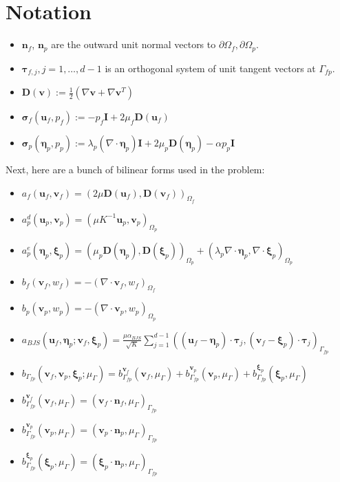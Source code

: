 \documentclass{article}
\newcommand{\mathspace}[1]{\ensuremath{#1}\xspace} %
\newcommand{\D}{\mathspace{\mathbf{D}}}
\newcommand{\sigmabf}{\mathspace{\boldsymbol{\sigma}}}
\newcommand{\grad}{\mathspace{\nabla}}
\renewcommand{\div}{\mathspace{\nabla \cdot}}
\newcommand{\inner}[2]{\mathspace{\left (#1, #2 \right)}}
\newcommand{\defeq}{\mathspace{:=}}
\newcommand{\taubf}{\mathspace{\boldsymbol{\tau}}}
\newcommand{\stokes}{\mathspace{\Omega_{f}}}
\newcommand{\darcy}{\mathspace{\Omega_{p}}}
\newcommand{\interface}{\mathspace{\Gamma_{fp}}}
\newcommand{\nf}{\mathspace{\mathbf{n}_f}}
\newcommand{\np}{\mathspace{\mathbf{n}_p}}
\newcommand{\uf}{\mathspace{\mathbf{u}_f}}
\newcommand{\vf}{\mathspace{\mathbf{v}_f}}
\newcommand{\up}{\mathspace{\mathbf{u}_p}}
\newcommand{\vp}{\mathspace{\mathbf{v}_p}}
\newcommand{\pf}{\mathspace{p_f}}
\newcommand{\pp}{\mathspace{p_p}}
\newcommand{\wf}{\mathspace{w_f}}
\renewcommand{\wp}{\mathspace{w_p}}
\newcommand{\disp}{\mathspace{\boldsymbol{\eta}_p}}
\newcommand{\disptest}{\mathspace{\boldsymbol{\xi}_p}}
\newcommand{\multtest}{\mathspace{\mu_{\Gamma}}}
\begin{document}
\section{Notation}
\begin{itemize}
\item \nf, \np are the outward unit normal vectors to $\partial \stokes, \partial \darcy$. 
\item $\taubf_{f, j}, j = 1, \ldots, d-1$ is an orthogonal system of unit tangent vectors at \interface.
\item $\D(\mathbf{v}) \defeq \frac 12 (\grad \mathbf{v} + \grad \mathbf{v}^T)$
\item $\sigmabf_f(\uf, \pf) \defeq -\pf \mathbf{I} + 2 \mu_f \D(\uf)$
\item $\sigmabf_p(\disp, \pp) \defeq \lambda_p (\div \disp)\mathbf{I}  + 2 \mu_p \D(\disp) - \alpha \pp \mathbf{I} $
\end{itemize}

Next, here are a bunch of bilinear forms used in the problem: 
\begin{itemize}
\item $a_f(\uf, \vf) = \inner{2\mu \D(\uf)} {\D(\vf)}_{\stokes}$
\item $a_p^d(\up, \vp) = \inner{\mu K^{-1}\up} {\vp}_{\darcy}$
\item $a_p^e(\disp, \disptest) = \inner{\mu_p \D(\disp)} {\D(\disptest)}_{\darcy} + \inner{\lambda_p \div \disp} {\div \disptest}_{\darcy}$
\item $b_f(\vf, \wf) = -\inner{\div \vf}{\wf}_{\stokes}$
\item $b_p(\vp, \wp) = -\inner{\div \vp}{\wp}_{\darcy}$
  
\item $a_{BJS}(\uf, \disp; \vf, \disptest) = \frac {\mu \alpha_{BJS}} {\sqrt{K}} \sum_{j=1}^{d-1} \inner{(\uf - \disp) \cdot \taubf_j}{ (\vf - \disptest) \cdot \taubf_j}_{\interface} $
\item $b_{\interface}(\vf, \vp, \disptest; \multtest) = b_{\interface}^{\vf}(\vf, \multtest)  + b_{\interface}^{\vp}(\vp, \multtest) + b_{\interface}^{\disptest}(\disptest, \multtest)$

\item $b_{\interface}^{\vf}(\vf, \multtest) = \inner{\vf \cdot \nf}{\multtest}_{\interface}$
\item $b_{\interface}^{\vp}(\vp, \multtest) = \inner{\vp \cdot \np}{\multtest}_{\interface}$
\item $b_{\interface}^{\disptest}(\disptest, \multtest) = \inner{\disptest \cdot \np}{\multtest}_{\interface}$
  
\end{itemize}
\end{document}
